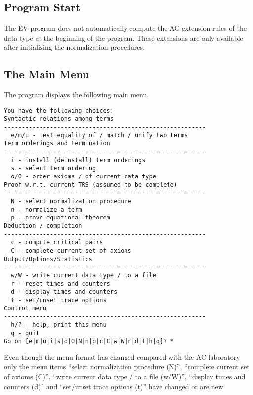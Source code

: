 \subsection{Program Start}
The EV-program does not automatically compute the AC-extension rules of the 
data type at the beginning of the program.
These extensions are only available after initializing the
normalization procedures.

\subsection{The Main Menu}

The program displays the following main menu.
\begin{verbatim}
You have the following choices:
Syntactic relations among terms
---------------------------------------------------------
  e/m/u - test equality of / match / unify two terms
Term orderings and termination
---------------------------------------------------------
  i - install (deinstall) term orderings
  s - select term ordering
  o/O - order axioms / of current data type
Proof w.r.t. current TRS (assumed to be complete)
---------------------------------------------------------
  N - select normalization procedure
  n - normalize a term
  p - prove equational theorem
Deduction / completion
---------------------------------------------------------
  c - compute critical pairs
  C - complete current set of axioms
Output/Options/Statistics
---------------------------------------------------------
  w/W - write current data type / to a file
  r - reset times and counters
  d - display times and counters
  t - set/unset trace options
Control menu
---------------------------------------------------------
  h/? - help, print this menu
  q - quit
Go on [e|m|u|i|s|o|O|N|n|p|c|C|w|W|r|d|t|h|q]? *
\end{verbatim}
Even though the menu format has changed compared with the AC-laboratory
only the menu items ``select normalization procedure (N)'',
``complete current set of axioms (C)'',
``write current data type / to a file (w/W)'',
``display times and counters (d)'' and
``set/unset trace options (t)'' have changed or are new.
